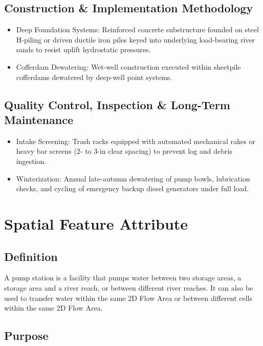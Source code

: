 \documentclass[
  letterpaper,
  DIV=11,
  numbers=noendperiod]{scrreprt}
\begin{document}
\subsection{Construction \& Implementation
Methodology}\label{construction-implementation-methodology-10}

\begin{itemize}
\item
  Deep Foundation Systems: Reinforced concrete substructure founded on
  steel H-piling or driven ductile iron piles keyed into underlying
  load-bearing river sands to resist uplift hydrostatic pressures.
\item
  Cofferdam Dewatering: Wet-well construction executed within sheetpile
  cofferdams dewatered by deep-well point systems.
\end{itemize}

\subsection{Quality Control, Inspection \& Long-Term
Maintenance}\label{quality-control-inspection-long-term-maintenance-10}

\begin{itemize}
\item
  Intake Screening: Trash racks equipped with automated mechanical rakes
  or heavy bar screens (2- to 3-in clear spacing) to prevent log and
  debris ingestion.
\item
  Winterization: Annual late-autumn dewatering of pump bowls,
  lubrication checks, and cycling of emergency backup diesel generators
  under full load.
\end{itemize}

\section{Spatial Feature Attribute}\label{spatial-feature-attribute-7}

\subsection{Definition}\label{definition-9}

A pump station is a facility that pumps water between two storage areas,
a storage area and a river reach, or between different river reaches. It
can also be used to transfer water within the same 2D Flow Area or
between different cells within the same 2D Flow Area.

\subsection{Purpose}\label{purpose-12}
\end{document}

